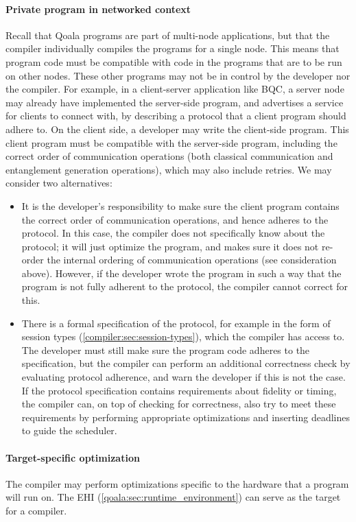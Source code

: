 \paragraph{Private program in networked context}
Recall that Qoala programs are part of multi-node applications, but that the compiler individually compiles the programs for a single node.
This means that program code must be compatible with code in the programs that are to be run on other nodes.
These other programs may not be in control by the developer nor the compiler.
For example, in a client-server application like BQC, a server node may already have implemented the server-side program, and advertises a service for clients to connect with, by describing a protocol that a client program should adhere to.
On the client side, a developer may write the client-side program.
This client program must be compatible with the server-side program, including the correct order of communication operations (both classical communication and entanglement generation operations), which may also include retries.
We may consider two alternatives:
\begin{itemize}
  \item It is the developer's responsibility to make sure the client program contains the correct order of communication operations, and hence adheres to the protocol.
  In this case, the compiler does not specifically know about the protocol; it will just optimize the program, and makes sure it does not re-order the internal ordering of communication operations (see consideration above).
  However, if the developer wrote the program in such a way that the program is not fully adherent to the protocol, the compiler cannot correct for this.
  \item There is a formal specification of the protocol, for example in the form of session types (\cref{compiler:sec:session-types}), which the compiler has access to.
  The developer must still make sure the program code adheres to the specification, but the compiler can perform an additional correctness check by evaluating protocol adherence, and warn the developer if this is not the case.
  If the protocol specification contains requirements about fidelity or timing, the compiler can, on top of checking for correctness, also try to meet these requirements by performing appropriate optimizations and inserting deadlines to guide the scheduler.
\end{itemize}



\paragraph{Target-specific optimization}
The compiler may perform optimizations specific to the hardware that a program will run on.
The \acf{EHI} (\cref{qoala:sec:runtime_environment}) can serve as the target for a compiler.



